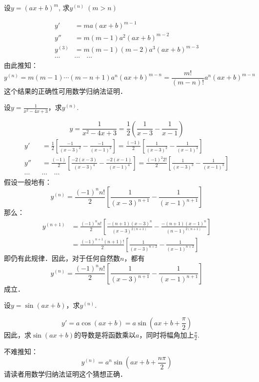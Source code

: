 \begin{example}
  设$y=(ax+b)^m$, 求$y^{(n)}\; (m>n)$  
\end{example}

\begin{solution}
\begin{align*}
y'&=ma(ax+b)^{m-1}\\
y''&=m(m-1)a^2(ax+b)^{m-2}\\
y^{(3)}&=m(m-1)(m-2)a^3(ax+b)^{m-3}\\
\cdots\quad &\cdots\quad \cdots
\end{align*}
由此推知：
\[y^{(n)}=m(m-1)\cdots(m-n+1)a^n(ax+b)^{m-n}=\frac{m!}{(m-n)!}a^n(ax+b)^{m-n}\]
这个结果的正确性可用数学归纳法证明．
\end{solution}


\begin{example}
设$y=\frac{1}{x^2-4x+3}$，求$y^{(n)}$.
\end{example}


\begin{solution}
\[y=\frac{1}{x^2-4x+3}=\frac{1}{2}\left(\frac{1}{x-3}-\frac{1}{x-1}\right)\]
\begin{align*}
    y'&=\frac{1}{2}\left[\frac{-1}{(x-3)^2}-\frac{-1}{(x-1)^2}\right]=\frac{(-1)}{2}\left[\frac{1}{(x-3)^2}-\frac{1}{(x-1)^2}\right]\\
    y''&=\frac{(-1)}{2}\left[\frac{-2(x-3)}{(x-3)^4}-\frac{-2(x-1)}{(x-1)^4}\right]=\frac{(-1)^2 2!}{2}\left[\frac{1}{(x-3)^3}-\frac{1}{(x-1)^3}\right]\\
    \cdots\quad &\cdots\quad \cdots
\end{align*}
假设一般地有：
\[y^{(n)}=\frac{(-1)^n n!}{2}\left[\frac{1}{(x-3)^{n+1}}-\frac{1}{(x-1)^{n+1}}\right]\]
那么：
\begin{align*}
    y^{(n+1)}&=\frac{(-1)^n n!}{2}\left[\frac{-(n+1)(x-3)^n}{(x-3)^{2(n+1)}}-\frac{-(n+1)(x-1)^n}{(n-1)^{2(n+1)}}\right]\\
    &=\frac{(-1)^{n+1} (n+1)!}{2}\left[\frac{1}{(x-3)^{n+2}}-\frac{1}{(x-1)^{n+2}}\right]
\end{align*}
即仍有此规律．因此，对于任何自然数$n$，都有
\[y^{(n)}=\frac{(-1)^n n!}{2}\left[\frac{1}{(x-3)^{n+1}}-\frac{1}{(x-1)^{n+1}}\right]\]
成立．
\end{solution}

\begin{example}
    设$y=\sin(ax+b)$，求$y^{(n)}$.
\end{example}


\begin{solution}
    \[y'=a\cos(ax+b)=a\sin\left(ax+b+\frac{\pi}{2}\right)\]
因此，求$\sin(ax+b)$的导数是将函数乘以$a$，同时将幅角加上$\frac{\pi}{2}$.

不难推知：
\[y^{(n)}=a^n\sin\left(ax+b+\frac{n\pi}{2}\right)\]
请读者用数学归纳法证明这个猜想正确．
\end{solution}

